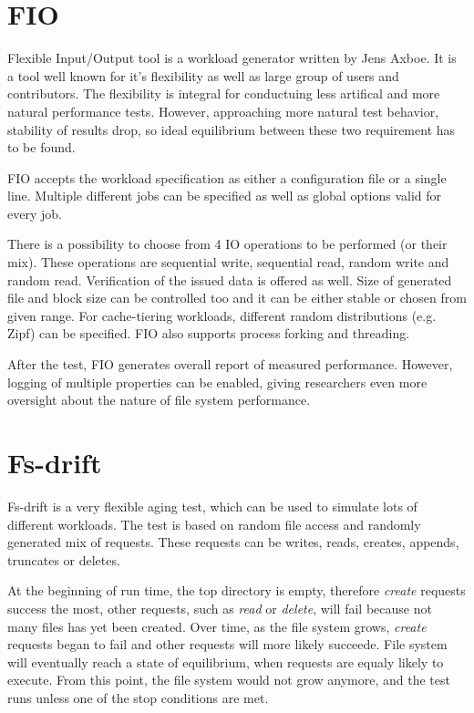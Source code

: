 \documentclass[
  color, %
  table, %
  lof,   %
  lot,   %
]{fithesis3}
\begin{document}
\section{FIO}
Flexible Input/Output tool is a workload generator written by Jens Axboe. It is a tool well known for it's flexibility as well as large group of users and contributors. The flexibility is integral for conductuing less artifical and more natural performance tests. However, approaching more natural test behavior, stability of results drop, so ideal equilibrium between these two requirement has to be found.

FIO accepts the workload specification as either a configuration file or a single line. Multiple different jobs can be specified as well as global options valid for every job. 

There is a possibility to choose from 4 IO operations to be performed (or their mix). These operations are sequential write, sequential read, random write and random read. Verification of the issued data is offered as well. Size of generated file and block size can be controlled too and it can be either stable or chosen from given range. For cache-tiering workloads, different random distributions (e.g. Zipf) can be specified. FIO also supports process forking and threading.

After the test, FIO generates overall report of measured performance. However, logging of multiple properties can be enabled, giving researchers even more oversight about the nature of file system performance.

\section{Fs-drift}
Fs-drift is a very flexible aging test, which can be used to simulate lots of different workloads. The test is based on random file access and randomly generated mix of requests. These requests can be writes, reads, creates, appends, truncates or deletes.

At the beginning of run time, the top directory is empty, therefore \textit{create} requests success the most, other requests, such as \textit{read} or \textit{delete}, will fail because not many files has yet been created. Over time, as the file system grows, \textit{create} requests began to fail and other requests will more likely succeede. File system will eventually reach a state of equilibrium, when requests are equaly likely to execute. From this point, the file system would not grow anymore, and the test runs unless one of the stop conditions are met.
\end{document}
